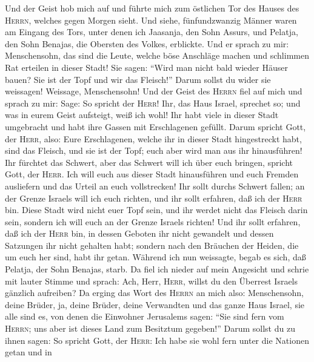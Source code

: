  Und der Geist hob mich auf und führte mich zum östlichen
Tor des Hauses des \textsc{Herrn}, welches gegen Morgen sieht. Und
siehe, fünfundzwanzig Männer waren am Eingang des Tors, unter denen ich
Jaasanja, den Sohn Assurs, und Pelatja, den Sohn Benajas, die Obersten
des Volkes, erblickte.  Und er sprach zu mir:
Menschensohn, das sind die Leute, welche böse Anschläge machen und
schlimmen Rat erteilen in dieser Stadt! Sie sagen:  ``Wird
man nicht bald wieder Häuser bauen? Sie ist der Topf und wir das
Fleisch!''  Darum sollst du wider sie weissagen! Weissage,
Menschensohn!  Und der Geist des \textsc{Herrn} fiel auf
mich und sprach zu mir: Sage: So spricht der \textsc{Herr}! Ihr, das
Haus Israel, sprechet so; und was in eurem Geist aufsteigt, weiß ich
wohl!  Ihr habt viele in dieser Stadt umgebracht und habt
ihre Gassen mit Erschlagenen gefüllt.  Darum spricht Gott,
der \textsc{Herr}, also: Eure Erschlagenen, welche ihr in dieser Stadt
hingestreckt habt, sind das Fleisch, und sie ist der Topf; euch aber
wird man aus ihr hinausführen!  Ihr fürchtet das Schwert,
aber das Schwert will ich über euch bringen, spricht Gott, der
\textsc{Herr}.  Ich will euch aus dieser Stadt
hinausführen und euch Fremden ausliefern und das Urteil an euch
vollstrecken!  Ihr sollt durchs Schwert fallen; an der
Grenze Israels will ich euch richten, und ihr sollt erfahren, daß ich
der \textsc{Herr} bin.  Diese Stadt wird nicht euer Topf
sein, und ihr werdet nicht das Fleisch darin sein, sondern ich will euch
an der Grenze Israels richten!  Und ihr sollt erfahren,
daß ich der \textsc{Herr} bin, in dessen Geboten ihr nicht gewandelt und
dessen Satzungen ihr nicht gehalten habt; sondern nach den Bräuchen der
Heiden, die um euch her sind, habt ihr getan.  Während
ich nun weissagte, begab es sich, daß Pelatja, der Sohn Benajas, starb.
Da fiel ich nieder auf mein Angesicht und schrie mit lauter Stimme und
sprach: Ach, Herr, \textsc{Herr}, willst du den Überrest Israels
gänzlich aufreiben?  Da erging das Wort des
\textsc{Herrn} an mich also:  Menschensohn, deine Brüder,
ja, deine Brüder, deine Verwandten und das ganze Haus Israel, sie alle
sind es, von denen die Einwohner Jerusalems sagen: ``Sie sind fern vom
\textsc{Herrn}; uns aber ist dieses Land zum Besitztum gegeben!''
 Darum sollst du zu ihnen sagen: So spricht Gott, der
\textsc{Herr}: Ich habe sie wohl fern unter die Nationen getan und in
